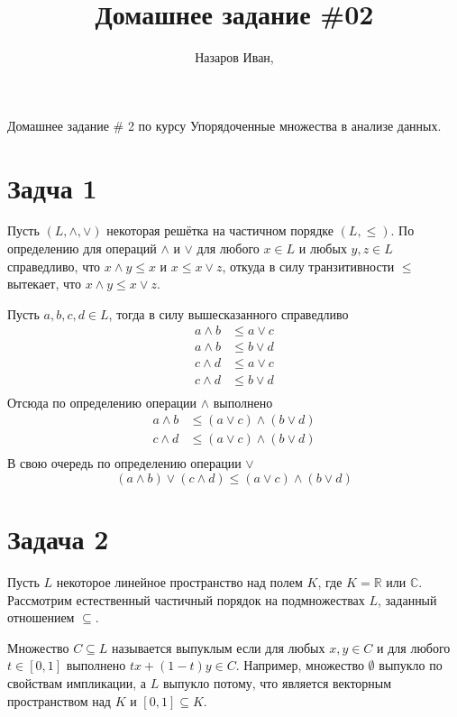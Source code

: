 \documentclass[a4paper]{article}
\title{Домашнее задание \#02}
\author{Назаров Иван, \rus{101мНОД(ИССА)}}
\newcommand{\clo}[1]{\left [ #1 \right ]}
\newcommand{\brac}[1]{\left ( #1 \right )}
\newcommand{\Real}{\mathbb{R}}
\newcommand{\Cplx}{\mathbb{C}}
\begin{document}
\maketitle
\noindent Домашнее задание \# 2 по курсу Упорядоченные множества в анализе данных.

\section{Задча 1} %
\label{sec:task_1}

Пусть $\brac{L, \wedge, \vee}$ некоторая решётка на частичном порядке $\brac{L,\leq}$. По определению для операций $\wedge$ и $\vee$ для любого $x\in L$ и любых $y,z\in L$ справедливо, что $x\wedge y\leq x$ и $x\leq x\vee z$, откуда в силу транзитивности $\leq$ вытекает, что $x\wedge y\leq x\vee z$.

Пусть $a,b,c,d\in L$, тогда в силу вышесказанного справедливо \begin{align*}
a\wedge b &\leq a\vee c\\a\wedge b &\leq b\vee d\\
c\wedge d &\leq a\vee c\\c\wedge d &\leq b\vee d\\
\end{align*} Отсюда по определению операции $\wedge$ выполнено \begin{align*}
a\wedge b &\leq \brac{a\vee c} \wedge \brac{b\vee d}\\
c\wedge d &\leq \brac{a\vee c} \wedge \brac{b\vee d}\\
\end{align*} В свою очередь по определению операции $\vee$ \[\brac{a\wedge b} \vee \brac{c\wedge d} \leq \brac{a\vee c} \wedge \brac{b\vee d}\]


\section{Задача 2} %
\label{sec:task_2}

Пусть $L$ некоторое линейное пространство над полем $K$, где $K = \Real$ или $\Cplx$. Рассмотрим естественный частичный порядок на подмножествах $L$, заданный отношением $\subseteq$.

Множество $C\subseteq L$ называется выпуклым если для любых $x,y\in C$ и для любого $t\in\clo{0,1}$ выполнено $t x + (1-t) y \in C$. Например, множество $\emptyset$ выпукло по свойствам импликации, а $L$ выпукло потому, что является векторным пространством над $K$ и $\clo{0,1}\subseteq K$.
\end{document}
